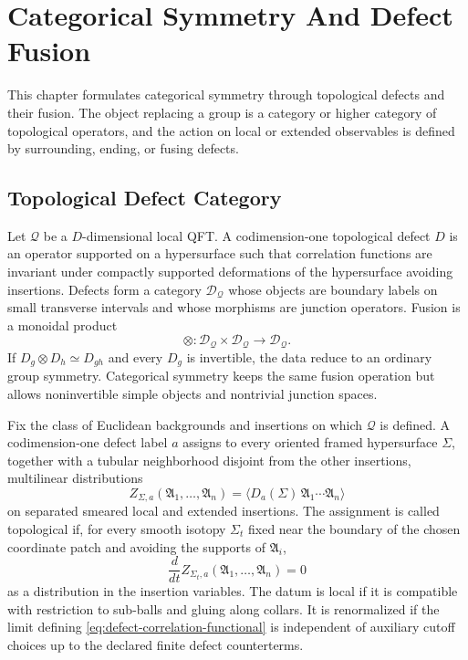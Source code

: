 \chapter{Categorical Symmetry And Defect Fusion}
\label{ch:global-categorical-symmetry-defect-fusion}

\ConventionsMixed

This chapter formulates categorical symmetry through topological defects and
their fusion.  The object replacing a group is a category or higher category
of topological operators, and the action on local or extended observables is
defined by surrounding, ending, or fusing defects.

\section{Topological Defect Category}

Let \(\mathcal Q\) be a \(D\)-dimensional local QFT.  A codimension-one
topological defect \(D\) is an operator supported on a hypersurface such that
correlation functions are invariant under compactly supported deformations of
the hypersurface avoiding insertions.  Defects form a category
\(\mathcal D_{\mathcal Q}\) whose objects are boundary labels on small
transverse intervals and whose morphisms are junction operators.  Fusion is a
monoidal product
\[
  \otimes:\mathcal D_{\mathcal Q}\times\mathcal D_{\mathcal Q}
  \longrightarrow \mathcal D_{\mathcal Q}.
\]
If \(D_g\otimes D_h\simeq D_{gh}\) and every \(D_g\) is invertible, the data
reduce to an ordinary group symmetry.  Categorical symmetry keeps the same
fusion operation but allows noninvertible simple objects and nontrivial
junction spaces.

\begin{definition}
\label{def:topological-defect-correlation-datum}
Fix the class of Euclidean backgrounds and insertions on which
\(\mathcal Q\) is defined.  A codimension-one defect label \(a\) assigns to
every oriented framed hypersurface \(\Sigma\), together with a tubular
neighborhood disjoint from the other insertions, multilinear distributions
\begin{equation}
  Z_{\Sigma,a}(\mathfrak A_1,\ldots,\mathfrak A_n)
  =
  \bigl\langle D_a(\Sigma)\,\mathfrak A_1\cdots\mathfrak A_n\bigr\rangle
  \label{eq:defect-correlation-functional}
\end{equation}
on separated smeared local and extended insertions.  The assignment is called
topological if, for every smooth isotopy \(\Sigma_t\) fixed near the boundary
of the chosen coordinate patch and avoiding the supports of
\(\mathfrak A_i\),
\begin{equation}
  \frac{d}{dt}
  Z_{\Sigma_t,a}(\mathfrak A_1,\ldots,\mathfrak A_n)=0
  \label{eq:defect-correlation-topological-invariance}
\end{equation}
as a distribution in the insertion variables.  The datum is local if it is
compatible with restriction to sub-balls and gluing along collars.  It is
renormalized if the limit defining
\eqref{eq:defect-correlation-functional} is independent of auxiliary cutoff
choices up to the declared finite defect counterterms.
\end{definition}


